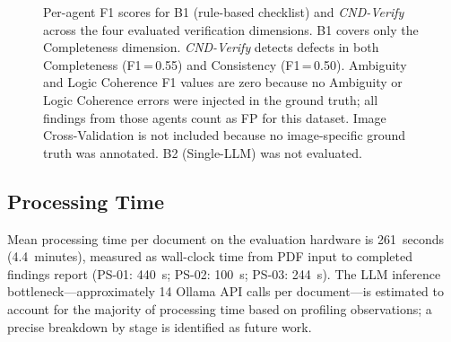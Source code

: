 \documentclass[journal]{IEEEtran}
\newcommand{\sys}{\textit{CND-Verify}}
\begin{document}
\begin{figure}[!t]
\centering
{}
\caption{Per-agent F1 scores for B1 (rule-based checklist) and \sys{} across
the four evaluated verification dimensions. B1 covers only the Completeness
dimension. \sys{} detects defects in both Completeness (F1\,=\,0.55) and
Consistency (F1\,=\,0.50). Ambiguity and Logic Coherence F1 values are zero
because no Ambiguity or Logic Coherence errors were injected in the ground
truth; all findings from those agents count as FP for this dataset.
Image Cross-Validation is not included because no image-specific ground truth
was annotated. B2 (Single-LLM) was not evaluated.}
\label{fig:results_bar}
\end{figure}

\subsection{Processing Time}

Mean processing time per document on the evaluation hardware is 261~seconds
(4.4~minutes), measured as wall-clock time from PDF input to completed findings
report (PS-01: 440~s; PS-02: 100~s; PS-03: 244~s). The LLM inference
bottleneck---approximately 14 Ollama API calls per document---is estimated to
account for the majority of processing time based on profiling observations;
a precise breakdown by stage is identified as future work.
\end{document}

